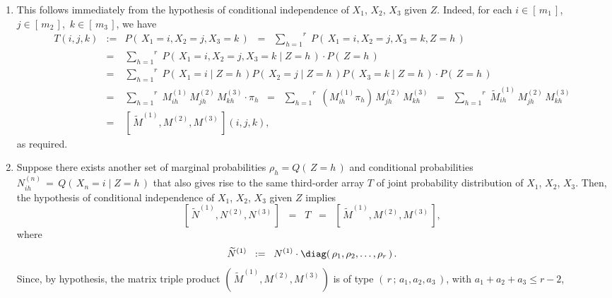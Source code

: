 \begin{enumerate}
\item
	This follows immediately from the hypothesis of conditional independence of $X_{1}$, $X_{2}$, $X_{3}$ given $Z$.
	Indeed, for each $i \in \left[\,m_{1}\,\right]$, \,$j \in \left[\,m_{2}\,\right]$, \,$k \in \left[\,m_{3}\,\right]$, we have
	\begin{eqnarray*}
	T(i,j,k)
	&:=&
		P\!\left(\,X_{1}=i, X_{2}=j, X_{3}=k\,\right)
	\;\; = \;\;
		\overset{r}{\underset{h=1}{\sum}}\;P\!\left(\,X_{1}=i, X_{2}=j, X_{3}=k, Z=h\,\right)
	\\
	&=&
		\overset{r}{\underset{h=1}{\sum}}\;P\!\left(\,X_{1}=i, X_{2}=j, X_{3}=k \;\vert\; Z=h\,\right)\cdot P\!\left(\,Z=h\,\right)
	\\
	&=&
		\overset{r}{\underset{h=1}{\sum}}\;
		P\!\left(\,X_{1}=i \;\vert\; Z=h\,\right)
		P\!\left(\,X_{2}=j \;\vert\; Z=h\,\right)
		P\!\left(\,X_{3}=k \;\vert\; Z=h\,\right)
		\cdot P\!\left(\,Z=h\,\right)
	\\
	&=&
		\overset{r}{\underset{h=1}{\sum}}\;
		M^{(1)}_{ih} \, M^{(2)}_{jh} \, M^{(3)}_{kh} \cdot \pi_{h}
	\;\;=\;\;
		\overset{r}{\underset{h=1}{\sum}}\;
		\left(M^{(1)}_{ih}\pi_{h}\right) \, M^{(2)}_{jh} \, M^{(3)}_{kh}
	\;\;=\;\;
		\overset{r}{\underset{h=1}{\sum}}\;
		\widetilde{M}^{(1)}_{ih} \, M^{(2)}_{jh} \, M^{(3)}_{kh}
	\\
	&=&
		\left[\,\widetilde{M}^{(1)},M^{(2)},M^{(3)}\,\right](i,j,k),
	\end{eqnarray*}
	as required.
\item
	Suppose there exists another set of marginal probabilities $\rho_{h} = Q\!\left(\,Z=h\,\right)$
	and conditional probabilities $N^{(n)}_{ih}\,=\,Q\!\left(\,X_{n}=i\;\vert\;Z=h\,\right)$ that also
	gives rise to the same third-order array $T$ of joint probability distribution of $X_{1}$, $X_{2}$, $X_{3}$.
	Then, the hypothesis of conditional independence of $X_{1}$, $X_{2}$, $X_{3}$ given $Z$
	implies
	\begin{equation*}
	\left[\,\widetilde{N}^{(1)},N^{(2)},N^{(3)}\,\right] \;\; = \;\; T \;\; = \;\; \left[\,\widetilde{M}^{(1)},M^{(2)},M^{(3)}\,\right],
	\end{equation*}
	where
	\begin{equation*}
	\widetilde{N}^{(1)} \;\; := \;\; N^{(1)}\cdot\diag\!\left(\,\rho_{1},\rho_{2},\ldots,\rho_{r}\,\right).
	\end{equation*}
	Since, by hypothesis, the matrix triple product $\left(\,\widetilde{M}^{(1)},M^{(2)},M^{(3)}\,\right)$
	is of type $\left(\,r\,;\,a_{1},a_{2},a_{3}\,\right)$, with $a_{1} + a_{2} + a_{3} \leq r - 2$,

\end{enumerate}
